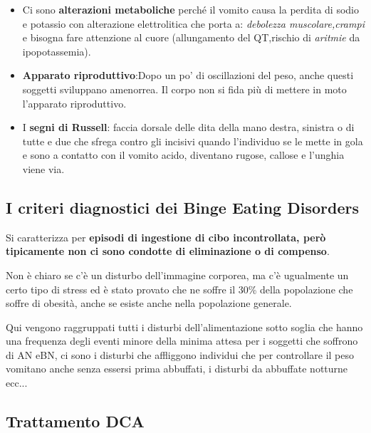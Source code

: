 \begin{itemize}
\item
  Ci sono \textbf{alterazioni metaboliche} perché il vomito causa la
  perdita di sodio e potassio con alterazione elettrolitica che porta a:
  \emph{debolezza muscolare,crampi} e bisogna fare attenzione al cuore
  (allungamento del QT,rischio di \emph{aritmie} da ipopotassemia).
\item
  \textbf{Apparato riproduttivo}:Dopo un po' di oscillazioni del peso,
  anche questi soggetti sviluppano amenorrea. Il corpo non si fida più
  di mettere in moto l'apparato riproduttivo.
\item
  I \textbf{segni di Russell}: faccia dorsale delle dita della mano
  destra, sinistra o di tutte e due che sfrega contro gli incisivi
  quando l'individuo se le mette in gola e sono a contatto con il vomito
  acido, diventano rugose, callose e l'unghia viene via.
\end{itemize}

\subsection{I criteri diagnostici dei Binge Eating Disorders}

Si caratterizza per \textbf{episodi di ingestione di cibo incontrollata,
però tipicamente non ci sono condotte di eliminazione o di compenso}.

Non è chiaro se c'è un disturbo dell'immagine corporea, ma c'è
ugualmente un certo tipo di stress ed è stato provato che ne soffre il
30\% della popolazione che soffre di obesità, anche se esiste anche
nella popolazione generale.

Qui vengono raggruppati tutti i disturbi dell'alimentazione sotto soglia
che hanno una frequenza degli eventi minore della minima attesa per i
soggetti che soffrono di AN eBN, ci sono i disturbi che affliggono
individui che per controllare il peso vomitano anche senza essersi prima
abbuffati, i disturbi da abbuffate notturne ecc...

\subsection{Trattamento DCA}

